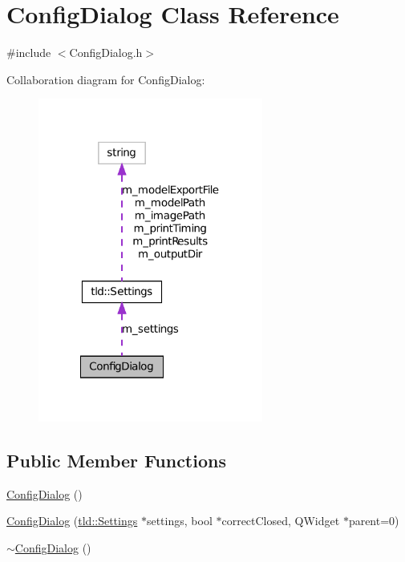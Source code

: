 \hypertarget{class_config_dialog}{
\section{ConfigDialog Class Reference}
\label{class_config_dialog}
}


{\ttfamily \#include $<$ConfigDialog.h$>$}



Collaboration diagram for ConfigDialog:
\nopagebreak
\begin{figure}[H]
\begin{center}
\leavevmode
\includegraphics[width=209pt]{class_config_dialog__coll__graph}
\end{center}
\end{figure}
\subsection*{Public Member Functions}
\begin{DoxyCompactItemize}
\item 
\hyperlink{class_config_dialog_a28fcaf732c9f363b30b2fc4a9abd9251}{ConfigDialog} ()
\item 
\hyperlink{class_config_dialog_a45966fcb35bfca9ee45fe9fc9447a4f5}{ConfigDialog} (\hyperlink{classtld_1_1_settings}{tld::Settings} $\ast$settings, bool $\ast$correctClosed, QWidget $\ast$parent=0)
\item 
\hyperlink{class_config_dialog_a485badac4dffa04603f800bb9d396e1d}{$\sim$ConfigDialog} ()
\end{DoxyCompactItemize}
